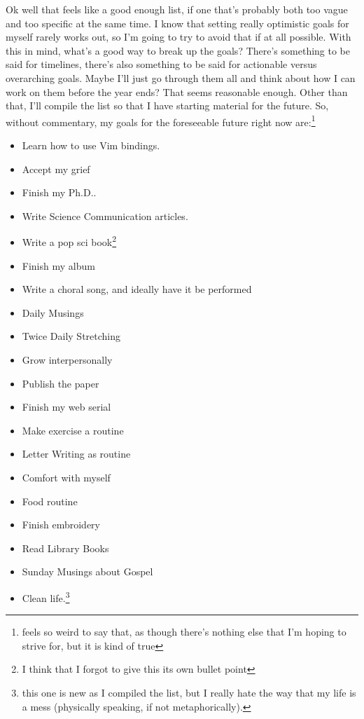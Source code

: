 \documentclass[12pt]{article}[titlepage]
\renewcommand{\,}{\textsuperscript{,}}
\begin{document}
Ok well that feels like a good enough list, if one that's probably both too vague and too specific at the same time. I know that setting really optimistic goals for myself rarely works out, so I'm going to try to avoid that if at all possible.  
With this in mind, what's a good way to break up the goals?  
There's something to be said for timelines, there's also something to be said for actionable versus overarching goals.  
Maybe I'll just go through them all and think about how I can work on them before the year ends?  
That seems reasonable enough.  
Other than that, I'll compile the list so that I have starting material for the future.  
So, without commentary, my goals for the foreseeable future right now are:\footnote{feels so weird to say that, as though there's nothing else that I'm hoping to strive for, but it is kind of true}

\begin{itemize}  
\item Learn how to use Vim bindings.  
\item Accept my grief  
\item Finish my Ph.D..  
\item Write Science Communication articles.  
\item Write a pop sci book\footnote{I think that I forgot to give this its own bullet point}  
\item Finish my album  
\item Write a choral song, and ideally have it be performed  
\item Daily Musings  
\item Twice Daily Stretching  
\item Grow interpersonally  
\item Publish the paper  
\item Finish my web serial  
\item Make exercise a routine  
\item Letter Writing as routine  
\item Comfort with myself  
\item Food routine  
\item Finish embroidery  
\item Read Library Books  
\item Sunday Musings about Gospel  
\item Clean life.\footnote{this one is new as I compiled the list, but I really hate the way that my life is a mess (physically speaking, if not metaphorically).}  
\end{itemize}
\end{document}
